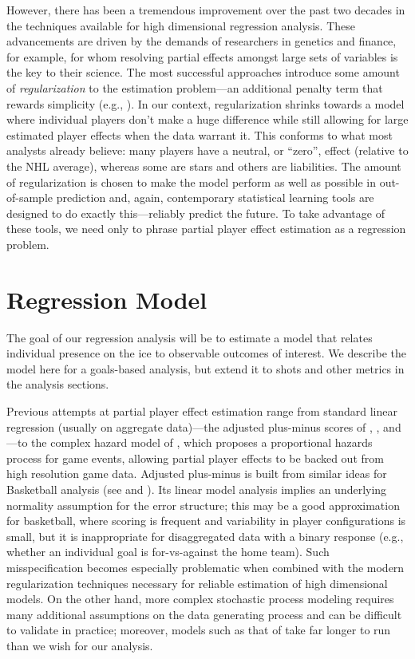 However, there has been a tremendous improvement over the past two decades in
the techniques available for high dimensional regression analysis.  These
advancements are driven by the demands of researchers in genetics and finance,
for example, for whom resolving partial effects amongst  large sets of
variables is the key to their science.  The most successful approaches
introduce some amount of \textit{regularization}  to the estimation
problem---an additional penalty term that rewards simplicity (e.g.,
\cite{hastie:tibsh:fried:2001}).  In our context, regularization shrinks
towards a model where individual players don't make a huge difference while
still allowing for large estimated player effects when the data warrant it.
This conforms to what most analysts already believe: many players have a
neutral, or ``zero'', effect (relative to the NHL average), whereas some are
stars and others are liabilities.     The amount of regularization is chosen
to make the model perform as well as possible in out-of-sample prediction and,
again, contemporary statistical learning tools are designed to do exactly
this---reliably predict the future. To take advantage of these tools, we  need
only to phrase partial player effect estimation  as a regression problem.


 
\section{Regression Model}
\label{sec:regression}

The goal of our regression analysis will be to estimate a model that  relates
individual presence on the ice to observable outcomes of interest.  We
describe the model here for a goals-based analysis, but extend it to shots and
other metrics in the analysis sections.

Previous attempts at partial player effect estimation range from standard
linear regression (usually on aggregate data)---the adjusted plus-minus
scores of \cite{awa09}, \cite{schlocwel10},  and \cite{mac10}---to the complex
hazard model of
\cite{ThoVenJen12}, which proposes a proportional hazards process for
game events, allowing partial player effects to be backed out from high
resolution game data. 
Adjusted plus-minus is built from similar ideas for Basketball analysis (see
\cite{ros04}and \cite{ilabar08}). Its linear model analysis implies an
underlying normality assumption for the error structure; this may be a good
approximation for basketball, where scoring is frequent and variability in
player configurations is small, but it is  inappropriate for disaggregated
data with a binary response (e.g., whether an individual goal is for-vs-against
the home team).  Such misspecification becomes especially problematic when
combined with the modern regularization techniques necessary for reliable
estimation of high dimensional models.  On the other hand, more complex
stochastic process modeling requires many additional assumptions on the data
generating process and can be difficult to validate in practice; moreover,
models such as that of \cite{ThoVenJen12} take far longer to run than we wish
for our analysis.

